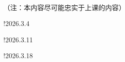 \begin{center}
    \\ （注：本内容尽可能忠实于上课的内容）

\end{center}

\begin{structure}

    \subpage!{2026.3.4}

    \subpage!{2026.3.11}

    \subpage!{2026.3.18}

    

\end{structure}